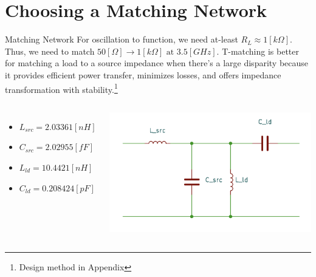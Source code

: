 \documentclass{beamer}
\begin{document}
\section{Choosing a Matching Network}


\begin{frame}{Matching Network}
For oscillation to function, we need at-least \(R_L\approx1[k\Omega]\). Thus, we need to match \(50[\Omega]\to1[k\Omega] \text{ at } 3.5[GHz]\). 
T-matching is better for matching a load to a source impedance when there's a large disparity because it provides efficient power transfer, minimizes losses, and offers impedance transformation with stability.\footnote{Design method in Appendix}
\begin{columns}

  \begin{itemize}
    \item \(L_{src} = 2.03361[nH]\)
    \item \(C_{src} = 2.02955[fF]\)
    \item \(L_{ld} = 10.4421[nH]\)
    \item \(C_{ld} = 0.208424[pF]\)
  \end{itemize}
  \includegraphics[width = \linewidth]{images/matching_network.png}
\end{columns}
  
\end{frame}
\end{document}
